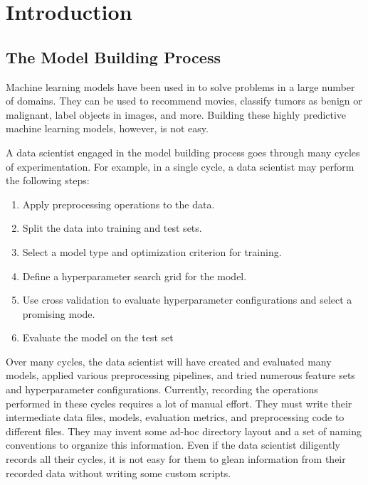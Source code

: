 \chapter{Introduction}
\section{The Model Building Process}
Machine learning models have been used in to solve problems in a large number of 
domains. They can be used to recommend movies\cite{patterson:risc}, 
classify tumors as benign or malignant, label objects in images, and more. 
Building these highly predictive machine learning models, however, is not easy. 

A data scientist engaged in the model building process goes through many cycles of
experimentation. For example, in a single cycle, a data scientist may perform the
following steps:

\begin{enumerate}
  \item Apply preprocessing operations to the data.
  \item Split the data into training and test sets.
  \item Select a model type and optimization criterion for training.
  \item Define a hyperparameter search grid for the model.
  \item Use cross validation to evaluate hyperparameter configurations and select a 
    promising mode.
  \item Evaluate the model on the test set
\end{enumerate}

Over many cycles, the data scientist will have created and evaluated many models,
applied various preprocessing pipelines, and tried numerous feature sets and hyperparameter
configurations. Currently, recording the operations performed in these cycles requires
a lot of manual effort. They must write their intermediate data files, models, evaluation metrics,
and preprocessing code to different files. They may invent some ad-hoc directory layout 
and a set of naming conventions to organize this information. Even if the data scientist
diligently records all their cycles, it is not easy for them to glean information from their
recorded data without writing some custom scripts.

